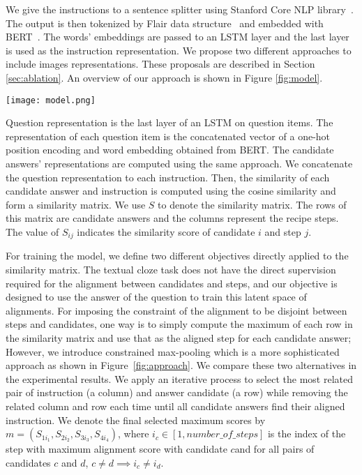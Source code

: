\documentclass[11pt,a4paper]{article}
\begin{document}
We give the instructions to a sentence splitter using Stanford Core NLP library~\cite{manning2014stanford}. The output is then tokenized by Flair data structure~\cite{akbik2018coling} and embedded with BERT~\cite{devlin-etal-2019-bert}. The words' embeddings are passed to an LSTM layer and the last layer is used as the instruction representation. We propose two different approaches to include images representations. These proposals are described in Section \ref{sec:ablation}. An overview of our approach is shown in Figure \ref{fig:model}.
\begin{figure*}[t]
    \centering
    \texttt{[image: model.png]}
    \caption{An overview of proposed model}
    \label{fig:model}
\end{figure*}

Question representation is the last layer of an LSTM on question items. The representation of each question item is the concatenated vector of a one-hot position encoding and word embedding obtained from BERT. The candidate answers' representations are computed using the same approach. We concatenate the question representation to each instruction. Then, the similarity of each candidate answer and instruction is computed using the cosine similarity and form a similarity matrix. We use $S$ to denote the similarity matrix. The rows of this matrix are candidate answers and the columns represent the recipe steps. The value of $S_{ij}$ indicates the similarity score of candidate $i$ and step $j$.

For training the model, we define two different objectives directly applied to the similarity matrix. The textual cloze task does not have the direct supervision required for the alignment between candidates and steps, and our objective is designed to use the answer of the question to train this latent space of alignments. For imposing the constraint of the alignment to be disjoint between steps and candidates, one way is to simply compute the maximum of each row in the similarity matrix and use that as the aligned step for each candidate answer; However, we introduce constrained max-pooling which is a more sophisticated approach as shown in Figure~\ref{fig:approach}. We compare these two alternatives in the experimental results. We apply an iterative process to select the most related pair of instruction (a column) and answer candidate (a row) while removing the related column and row each time until all candidate answers find their aligned instruction. We denote the final selected maximum scores by $m = (S_{1i_{1}}, S_{2i_{2}}, S_{3i_{3}}, S_{4i_{4}})$, where $i_{c} \in [1, number\_of\_steps]$ is the index of the step with maximum alignment score with candidate $c$and for all pairs of candidates $c$ and $d$, $c \neq d \implies i_{c} \neq i_{d}$.
\end{document}
